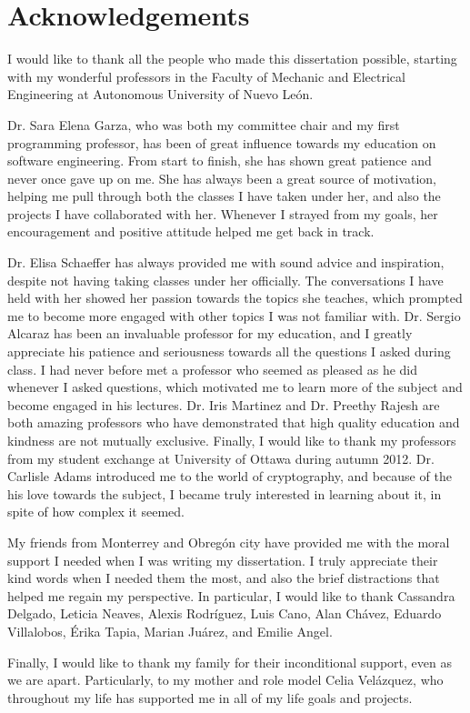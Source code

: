 \chapter*{Acknowledgements}

I would like to thank all the people who made this dissertation possible, starting with my wonderful professors in the Faculty of Mechanic and Electrical Engineering at Autonomous University of Nuevo Le\'{o}n. 

Dr. Sara Elena Garza, who was both my committee chair and my first programming professor, has been of great influence towards my education on software engineering. From start to finish, she has shown great patience and never once gave up on me. She has always been a great source of motivation, helping me pull through both the classes I have taken under her, and also the projects I have collaborated with her. Whenever I strayed from my goals, her encouragement and positive attitude helped me get back in track. 

Dr. Elisa Schaeffer has always provided me with sound advice and inspiration, despite not having taking classes under her officially. The conversations I have held with her showed her passion towards the topics she teaches, which prompted me to become more engaged with other topics I was not familiar with. Dr. Sergio Alcaraz has been an invaluable professor for my education, and I greatly appreciate his patience and seriousness towards all the questions I asked during class. I had never before met a professor who seemed as pleased as he did whenever I asked questions, which motivated me to learn more of the subject and become engaged in his lectures. Dr. Iris Martinez and Dr. Preethy Rajesh are both amazing professors who have demonstrated that high quality education and kindness are not mutually exclusive. Finally, I would like to thank my professors from my student exchange at University of Ottawa during autumn 2012. Dr. Carlisle Adams introduced me to the world of cryptography, and because of the his love towards the subject, I became truly interested in learning about it, in spite of how complex it seemed.

My friends from Monterrey and Obreg\'{o}n city have provided me with the moral support I needed when I was writing my dissertation. I truly appreciate their kind words when I needed them the most, and also the brief distractions that helped me regain my perspective. In particular, I would like to thank Cassandra Delgado, Leticia Neaves, Alexis Rodr\'{i}guez, Luis Cano, Alan Ch\'{a}vez, Eduardo Villalobos, \'{E}rika Tapia, Marian Ju\'{a}rez, and Emilie Angel.

Finally, I would like to thank my family for their inconditional support, even as we are apart. Particularly, to my mother and role model Celia Vel\'{a}zquez, who throughout my life has supported me in all of my life goals and projects. 

\newpage
